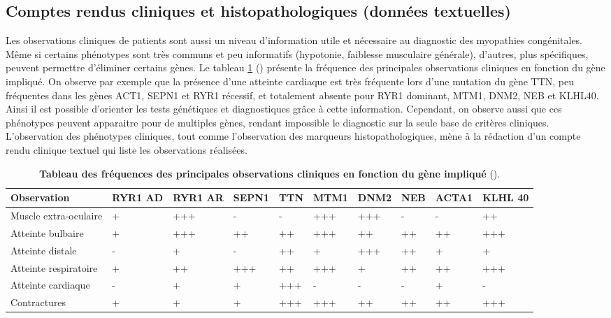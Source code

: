 \subsection{Comptes rendus cliniques et histopathologiques (données textuelles) }
Les observations cliniques de patients sont aussi un niveau d'information utile et nécessaire au diagnostic des myopathies congénitales. Même si certains phénotypes sont très communs et peu informatifs (hypotonie, faiblesse musculaire générale), d'autres, plus spécifiques, peuvent permettre d'éliminer certains gènes. Le tableau \ref{tab:clinic} (\cite{jungbluth_congenital_2018}) présente la fréquence des principales observations cliniques en fonction du gène impliqué. On observe par exemple que la présence d'une atteinte cardiaque est très fréquente lors d'une mutation du gène TTN, peu fréquentes dans les gènes ACT1, SEPN1 et RYR1 récessif, et totalement absente pour RYR1 dominant, MTM1, DNM2, NEB et KLHL40. Ainsi il est possible d'orienter les tests génétiques et diagnostiques grâce à cette information. Cependant, on observe aussi que ces phénotypes peuvent apparaitre pour de multiples gènes, rendant impossible le diagnostic sur la seule base de critères cliniques. L'observation des phénotypes cliniques, tout comme l'observation des marqueurs histopathologiques, mène à la rédaction d'un compte rendu clinique textuel qui liste les observations réalisées.

\begin{table}[!ht]
\begin{tabularx}{\textwidth}{|p{1.8cm}|X|X|X|X|X|X|X|X|X|}
 \hline
\textbf{Observation} & \textbf{RYR1 AD} & \textbf{RYR1 AR} & \textbf{SEPN1} & \textbf{TTN} & \textbf{MTM1} & \textbf{DNM2} & \textbf{NEB} & \textbf{ACTA1} & \textbf{KLHL 40} \\
\hline
Muscle extra-oculaire & + & +++ & - & - & +++ & +++ & - & - & ++ \\
\hline
Atteinte bulbaire & + & +++ & ++ & ++ & +++ & ++ & ++ & ++ & +++ \\
\hline
Atteinte distale & - & + & - & ++ & + & +++ & ++ & + & + \\
\hline
Atteinte respiratoire & + & ++ & +++ & ++ & +++ & + & ++ & ++ & +++ \\
\hline
Atteinte cardiaque & - & + & + & +++ & - & - & - & + & - \\
\hline
Contractures & + & + & + & +++ & +++ & ++ & ++ & ++ & +++ \\
\hline
\end{tabularx}
\caption[Tableau des fréquences des principales observations cliniques en fonction du gène impliqué]{\textbf{Tableau des fréquences des principales observations cliniques en fonction du gène impliqué} (\cite{jungbluth_congenital_2018}). }
\label{tab:clinic}
\end{table}

